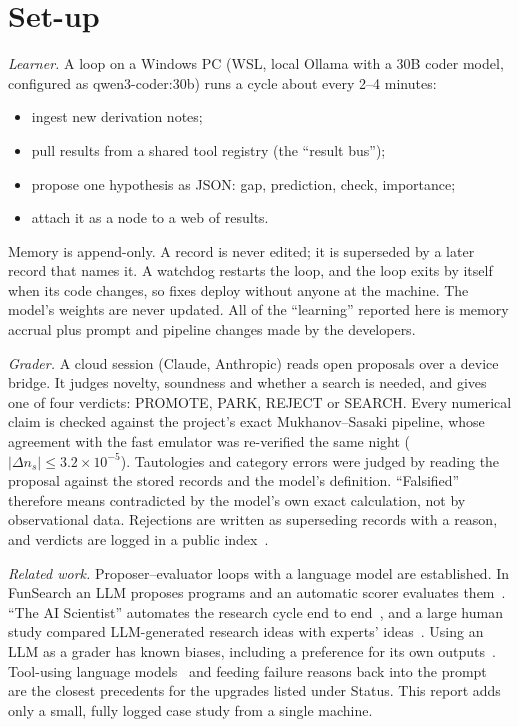 \documentclass[aps,prd,twocolumn,superscriptaddress,nofootinbib,showkeys]{revtex4-2}
\begin{document}
\section{Set-up}
\emph{Learner.} A loop on a Windows PC (WSL, local Ollama with a 30B coder model, configured as qwen3-coder:30b) runs a cycle about every 2--4 minutes:
\begin{itemize}
\item ingest new derivation notes;
\item pull results from a shared tool registry (the ``result bus'');
\item propose one hypothesis as JSON: gap, prediction, check, importance;
\item attach it as a node to a web of results.
\end{itemize}
Memory is append-only. A record is never edited; it is superseded by a later record that names it. A watchdog restarts the loop, and the loop exits by itself when its code changes, so fixes deploy without anyone at the machine. The model's weights are never updated. All of the ``learning'' reported here is memory accrual plus prompt and pipeline changes made by the developers.

\emph{Grader.} A cloud session (Claude, Anthropic) reads open proposals over a device bridge. It judges novelty, soundness and whether a search is needed, and gives one of four verdicts: PROMOTE, PARK, REJECT or SEARCH. Every numerical claim is checked against the project's exact Mukhanov--Sasaki pipeline, whose agreement with the fast emulator was re-verified the same night ($|\Delta n_s|\le3.2\times10^{-5}$). Tautologies and category errors were judged by reading the proposal against the stored records and the model's definition. ``Falsified'' therefore means contradicted by the model's own exact calculation, not by observational data. Rejections are written as superseding records with a reason, and verdicts are logged in a public index~\cite{AEGIS}.

\emph{Related work.} Proposer--evaluator loops with a language model are established. In FunSearch an LLM proposes programs and an automatic scorer evaluates them~\cite{FunSearch}. ``The AI Scientist'' automates the research cycle end to end~\cite{AIScientist}, and a large human study compared LLM-generated research ideas with experts' ideas~\cite{Si}. Using an LLM as a grader has known biases, including a preference for its own outputs~\cite{Zheng,Panickssery}. Tool-using language models~\cite{Toolformer,ReAct} and feeding failure reasons back into the prompt~\cite{Reflexion} are the closest precedents for the upgrades listed under Status. This report adds only a small, fully logged case study from a single machine.
\end{document}

